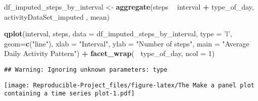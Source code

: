 \documentclass[
]{article}
\newenvironment{Shaded}{\begin{snugshade}}{\end{snugshade}}
\newcommand{\DataTypeTok}[1]{\textcolor[rgb]{0.13,0.29,0.53}{#1}}
\newcommand{\DecValTok}[1]{\textcolor[rgb]{0.00,0.00,0.81}{#1}}
\newcommand{\KeywordTok}[1]{\textcolor[rgb]{0.13,0.29,0.53}{\textbf{#1}}}
\newcommand{\NormalTok}[1]{#1}
\newcommand{\OperatorTok}[1]{\textcolor[rgb]{0.81,0.36,0.00}{\textbf{#1}}}
\newcommand{\StringTok}[1]{\textcolor[rgb]{0.31,0.60,0.02}{#1}}
\begin{document}
\begin{Shaded}
\end{Shaded}

\begin{Shaded}
\begin{Highlighting}[]
\NormalTok{df_imputed_steps_by_interval <-}\StringTok{ }\KeywordTok{aggregate}\NormalTok{(steps }\OperatorTok{~}\StringTok{ }\NormalTok{interval }\OperatorTok{+}\StringTok{ }\NormalTok{type_of_day, activityDataSet_imputed , mean)}
\end{Highlighting}
\end{Shaded}

\begin{Shaded}
\begin{Highlighting}[]
\KeywordTok{qplot}\NormalTok{(interval, }
\NormalTok{      steps, }
      \DataTypeTok{data =}\NormalTok{ df_imputed_steps_by_interval, }
      \DataTypeTok{type =} \StringTok{'l'}\NormalTok{, }
      \DataTypeTok{geom=}\KeywordTok{c}\NormalTok{(}\StringTok{"line"}\NormalTok{),}
      \DataTypeTok{xlab =} \StringTok{"Interval"}\NormalTok{, }
      \DataTypeTok{ylab =} \StringTok{"Number of steps"}\NormalTok{, }
      \DataTypeTok{main =} \StringTok{"Average Daily Activity Pattern"}\NormalTok{) }\OperatorTok{+}
\StringTok{  }\KeywordTok{facet_wrap}\NormalTok{(}\OperatorTok{~}\StringTok{ }\NormalTok{type_of_day, }\DataTypeTok{ncol =} \DecValTok{1}\NormalTok{)}
\end{Highlighting}
\end{Shaded}

\begin{verbatim}
## Warning: Ignoring unknown parameters: type
\end{verbatim}

\texttt{[image: Reproducible-Project\_files/figure-latex/The Make a panel plot containing a time series plot-1.pdf]}
\end{document}
